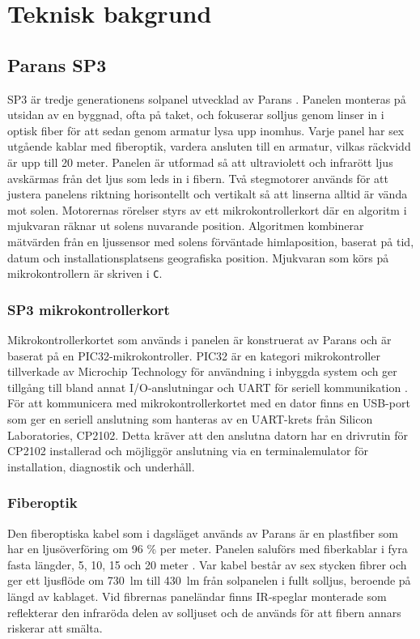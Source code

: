 \section{Teknisk bakgrund} %
\label{sec:teknisk_bakgrund}
    \subsection{Parans SP3} %
    \label{sub:parans_sp3}
        SP3 är tredje generationens solpanel utvecklad av Parans \cite{parans_manual}. Panelen monteras på utsidan av en byggnad, ofta på taket, och fokuserar solljus genom linser in i optisk fiber för att sedan genom armatur lysa upp inomhus. Varje panel har sex utgående kablar med fiberoptik, vardera ansluten till en armatur, vilkas räckvidd är upp till 20 meter. Panelen är utformad så att ultraviolett och infrarött ljus avskärmas från det ljus som leds in i fibern. Två stegmotorer används för att justera panelens riktning horisontellt och vertikalt så att linserna alltid är vända mot solen. Motorernas rörelser styrs av ett mikrokontrollerkort där en algoritm i mjukvaran räknar ut solens nuvarande position. Algoritmen kombinerar mätvärden från en ljussensor med solens förväntade himlaposition, baserat på tid, datum och installationsplatsens geografiska position. Mjukvaran som körs på mikrokontrollern är skriven i \texttt{C}.

        \subsubsection{SP3 mikrokontrollerkort} %
        \label{ssub:sp3_mikrokontrollerkort}
            Mikrokontrollerkortet som används i panelen är konstruerat av Parans och är baserat på en PIC32-mikrokontroller. PIC32 är en kategori mikrokontroller tillverkade av Microchip Technology för användning i inbyggda system och ger tillgång till bland annat I/O-anslutningar och UART för seriell kommunikation \cite{PIC32}. För att kommunicera med mikrokontrollerkortet med en dator finns en USB-port som ger en seriell anslutning som hanteras av en UART-krets från Silicon Laboratories, CP2102. Detta kräver att den anslutna datorn har en drivrutin för CP2102 installerad och möjliggör anslutning via en terminalemulator för installation, diagnostik och underhåll.

        \subsubsection{Fiberoptik} %
        \label{ssub:fiberoptik}
            Den fiberoptiska kabel som i dagsläget används av Parans är en plastfiber som har en ljusöverföring om 96 \% per meter. Panelen saluförs med fiberkablar i fyra fasta längder, 5, 10, 15 och 20 meter \cite{parans_spec}. Var kabel består av sex stycken fibrer och ger ett ljusflöde om 730~lm till 430~lm från solpanelen i fullt solljus, beroende på längd av kablaget. Vid fibrernas paneländar finns IR-speglar monterade som reflekterar den infraröda delen av solljuset och de används för att fibern annars riskerar att smälta.

